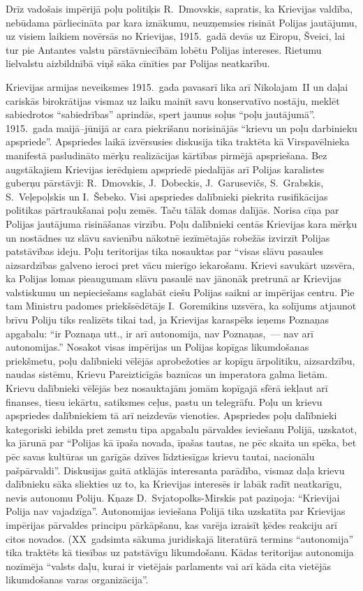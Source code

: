 \documentclass[twoside,a5paper,12pt,fleqn,openany]{extbook}
\begin{document}
Drīz vadošais impērijā poļu politiķis R.~Dmovskis, sapratis, ka Krievijas valdība, nebūdama pārliecināta par kara iznākumu, neuzņemsies risināt Polijas jautājumu, uz visiem laikiem novērsās no Krievijas, 1915.~gadā devās uz Eiropu, Šveici, lai tur pie Antantes valstu pārstāvniecībām lobētu Polijas intereses. Rietumu lielvalstu aizbildnībā viņš sāka cīnīties par Polijas neatkarību.

Krievijas armijas neveiksmes 1915.~gada pavasarī lika arī Nikolajam~II un daļai cariskās birokrātijas vismaz uz laiku mainīt savu konservatīvo nostāju, meklēt sabiedrotos ``sabiedrības'' aprindās, spert jaunus soļus ``poļu jautājumā''. 1915.~gada maijā--jūnijā ar cara piekrišanu norisinājās ``krievu un poļu darbinieku apspriede''. Apspriedes laikā izvērsusies diskusija tika traktēta kā Virspavēlnieka manifestā pasludināto mērķu realizācijas kārtības pirmējā apspriešana. Bez augstākajiem Krievijas ierēdņiem apspriedē piedalījās arī Polijas karalistes guberņu pārstāvji: R.~Dmovskis, J.~Dobeckis, J.~Garusevičs, S.~Grabskis, S.~Veļepoļskis un I.~Šebeko. Visi apspriedes dalībnieki piekrita rusifikācijas politikas pārtraukšanai poļu zemēs. Taču tālāk domas dalījās. Norisa cīņa par Polijas jautājuma risināšanas virzību. Poļu dalībnieki centās Krievijas kara mērķu un nostādnes uz slāvu savienību nākotnē iezīmētajās robežās izvirzīt Polijas patstāvības ideju. Poļu teritorijas tika nosauktas par ``visas slāvu pasaules aizsardzības galveno ieroci pret vācu mierīgo iekarošanu. Krievi savukārt uzsvēra, ka Polijas lomas pieaugumam slāvu pasaulē nav jānonāk pretrunā ar Krievijas valstiskumu un nepieciešams saglabāt ciešu Polijas saikni ar impērijas centru. Pie tam Ministru padomes priekšsēdētājs I.~Goremikins uzsvēra, ka solījums atjaunot brīvu Poliju tiks realizēts tikai tad, ja Krievijas karaspēks ieņems Poznaņas apgabalu: ``ir Poznaņa utt., ir arī autonomija, nav Poznaņas,~--- nav arī autonomijas.'' Nosakot visas impērijas un Polijas kopīgas likumdošanas priekšmetu, poļu dalībnieki vēlējās aprobežoties ar kopīgu ārpolitiku, aizsardzību, naudas sistēmu, Krievu Pareizticīgās baznīcas un imperatora galma lietām. Krievu dalībnieki vēlējās bez nosauktajām jomām kopīgajā sfērā iekļaut arī finanses, tiesu iekārtu, satiksmes ceļus, pastu un telegrāfu. Poļu un krievu apspriedes dalībniekiem tā arī neizdevās vienoties. Apspriedes poļu dalībnieki kategoriski iebilda pret zemstu tipa apgabalu pārvaldes ieviešanu Polijā, uzskatot, ka jārunā par ``Polijas kā īpaša novada, īpašas tautas, ne pēc skaita un spēka, bet pēc savas kultūras un garīgās dzīves līdztiesīgas krievu tautai, nacionālu pašpārvaldi''. Diskusijas gaitā atklājās interesanta parādība, vismaz daļa krievu dalībnieku sāka sliekties uz to, ka Krievijas interesēs ir labāk radīt neatkarīgu, nevis autonomu Poliju. Kņazs D.~Svjatopolks-Mirskis pat paziņoja: ``Krievijai Polija nav vajadzīga''. Autonomijas ieviešana Polijā tika uzskatīta par Krievijas impērijas pārvaldes principu pārkāpšanu, kas varēja izraisīt ķēdes reakciju arī citos novados. (XX~gadsimta sākuma juridiskajā literatūrā termins ``autonomija'' tika traktēts kā tiesības uz patstāvīgu likumdošanu. Kādas teritorijas autonomija nozīmēja ``valsts daļu, kurai ir vietējais parlaments vai arī kāda cita vietējās likumdošanas varas organizācija''. 
\end{document}
